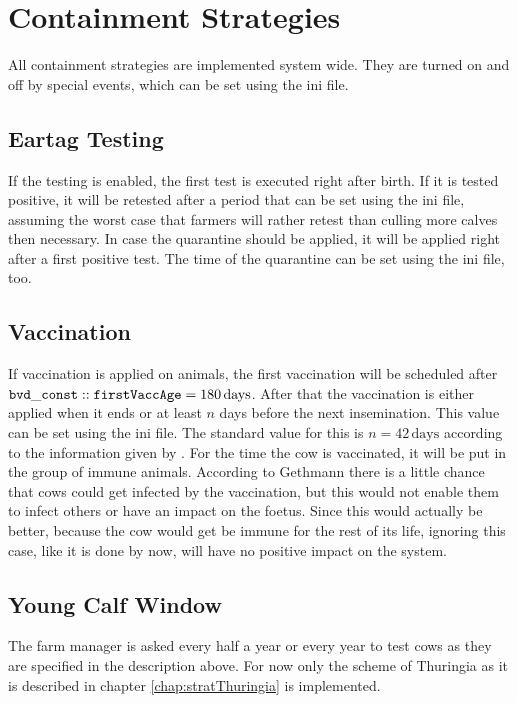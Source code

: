 \section{Containment Strategies}
All containment strategies are implemented system wide. They are turned on and off by special events, which can be set using the ini file. 
\subsection{Eartag Testing}
If the testing is enabled, the first test is executed right after birth. If it is tested positive, it will be retested after a period that can be set using the ini file, assuming the worst case that farmers will rather retest than culling more calves then necessary. In case the quarantine should be applied, it will be applied right after a first positive test. The time of the quarantine can be set using the ini file, too. 
\subsection{Vaccination}
If vaccination is applied on animals, the first vaccination will be scheduled after ${\tt bvd\_const::firstVaccAge}= 180\,\text{days}$. After that the vaccination is either applied when it ends or at least $n$ days before the next insemination. This value can be set using the ini file. The standard value for this is $n=42\,\text{days}$ according to the information given by \citep{personalCom}. For the time the cow is vaccinated, it will be put in the group of immune animals. According to Gethmann there is a little chance that cows could get infected by the vaccination, but this would not enable them to infect others or have an impact on the foetus. Since this would actually be better, because the cow would get be immune for the rest of its life, ignoring this case, like it is done by now, will have no positive impact on the system.
\subsection{Young Calf Window}
The farm manager is asked every half a year or every year to test cows as they are specified in the description above. For now only the scheme of Thuringia as it is described in chapter \ref{chap:stratThuringia} is implemented. 